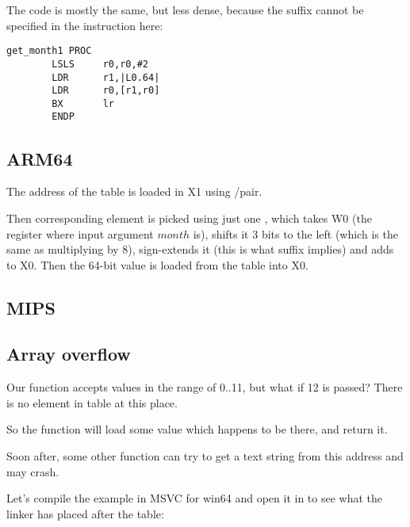 The code is mostly the same, but less dense, because the \LSL suffix cannot be specified in the \LDR instruction here:

\begin{lstlisting}
get_month1 PROC
        LSLS     r0,r0,#2
        LDR      r1,|L0.64|
        LDR      r0,[r1,r0]
        BX       lr
        ENDP
\end{lstlisting}

\subsection{ARM64}




The address of the table is loaded in X1 using \ADRP/\ADD pair.

Then corresponding element is picked using just one \LDR, which takes W0 
(the register where input argument $month$ is), shifts it 3 bits to the left (which is the same as multiplying by 8), 
sign-extends it (this is what  suffix implies) and adds to X0.
Then the 64-bit value is loaded from the table into X0.

\subsection{MIPS}



\subsection{Array overflow}

Our function accepts values in the range of 0..11, but what if 12 is passed?
There is no element in table at this place.

So the function will load some value which happens to be there, and return it.

Soon after, some other function can try to get a text string from this address and may crash.

Let's compile the example in MSVC for win64 and open it in \IDA to see what the linker has placed after the table:



